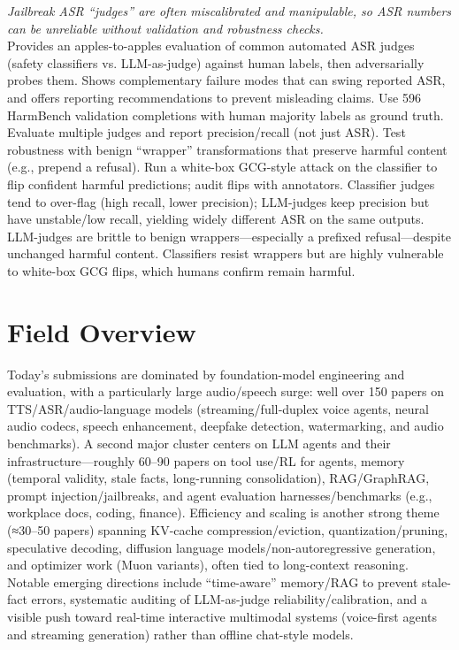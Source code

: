 \documentclass[12pt,letterpaper]{article}
\begin{document}
{\small\textit{Jailbreak ASR ``judges'' are often miscalibrated and manipulable, so ASR numbers can be unreliable without validation and robustness checks.}}\\[1pt]
{\footnotesize Provides an apples-to-apples evaluation of common automated ASR judges (safety classifiers vs. LLM-as-judge) against human labels, then adversarially probes them. Shows complementary failure modes that can swing reported ASR, and offers reporting recommendations to prevent misleading claims. Use 596 HarmBench validation completions with human majority labels as ground truth. Evaluate multiple judges and report precision/recall (not just ASR). Test robustness with benign ``wrapper'' transformations that preserve harmful content (e.g., prepend a refusal). Run a white-box GCG-style attack on the classifier to flip confident harmful predictions; audit flips with annotators. Classifier judges tend to over-flag (high recall, lower precision); LLM-judges keep precision but have unstable/low recall, yielding widely different ASR on the same outputs. LLM-judges are brittle to benign wrappers---especially a prefixed refusal---despite unchanged harmful content. Classifiers resist wrappers but are highly vulnerable to white-box GCG flips, which humans confirm remain harmful.}

\medskip



\section*{Field Overview}
{\footnotesize Today's submissions are dominated by foundation-model engineering and evaluation, with a particularly large audio/speech surge: well over 150 papers on TTS/ASR/audio-language models (streaming/full‑duplex voice agents, neural audio codecs, speech enhancement, deepfake detection, watermarking, and audio benchmarks). A second major cluster centers on LLM agents and their infrastructure---roughly 60--90 papers on tool use/RL for agents, memory (temporal validity, stale facts, long-running consolidation), RAG/GraphRAG, prompt injection/jailbreaks, and agent evaluation harnesses/benchmarks (e.g., workplace docs, coding, finance). Efficiency and scaling is another strong theme (≈30--50 papers) spanning KV-cache compression/eviction, quantization/pruning, speculative decoding, diffusion language models/non-autoregressive generation, and optimizer work (Muon variants), often tied to long-context reasoning. Notable emerging directions include ``time-aware'' memory/RAG to prevent stale-fact errors, systematic auditing of LLM-as-judge reliability/calibration, and a visible push toward real-time interactive multimodal systems (voice-first agents and streaming generation) rather than offline chat-style models.}
\end{document}
